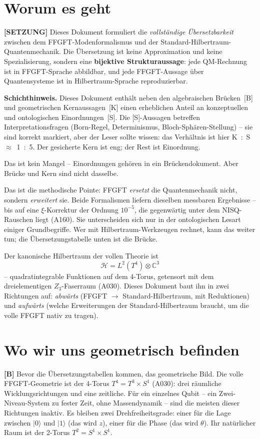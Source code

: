 \section{Worum es geht}

\textbf{[SETZUNG]} Dieses Dokument formuliert die \emph{vollständige
Übersetzbarkeit} zwischen dem FFGFT-Modenformalismus und der
Standard-Hilbert\-raum-Quantenmechanik. Die Übersetzung ist keine Approximation
und keine Spezialisierung, sondern eine \textbf{bijektive Strukturaussage}: jede
QM-Rechnung ist in FFGFT-Sprache abbildbar, und jede FFGFT-Aussage über
Quantensysteme ist in Hilbertraum-Sprache reproduzierbar.

\textbf{Schichthinweis.} Dieses Dokument enthält neben den algebraischen
Brücken~[B] und geometrischen Kernaussagen~[K] einen erheblichen Anteil an
konzeptuellen und ontologischen Einordnungen~[S]. Die [S]-Aussagen betreffen
Interpretationsfragen (Born-Regel, Determinismus, Bloch-Sphären-Stellung) --
sie sind korrekt markiert, aber der Leser sollte wissen: das Verhältnis ist
hier K~:~S~$\approx$~1~:~5. Der gesicherte Kern ist eng; der Rest ist Einordnung.

Das ist kein Mangel -- Einordnungen gehören in ein Brückendokument. Aber
Brücke und Kern sind nicht dasselbe.

Das ist die methodische Pointe: FFGFT \emph{ersetzt} die Quantenmechanik nicht,
sondern \emph{erweitert} sie. Beide Formalismen liefern dieselben messbaren Ergebnisse -- bis auf eine $\xi$-Korrektur der Ordnung $10^{-5}$, die
gegenwärtig unter dem NISQ-Rauschen liegt (A160). Sie unterscheiden sich nur in
der ontologischen Lesart einiger Grundbegriffe. Wer mit Hilbertraum-Werkzeugen
rechnet, kann das weiter tun; die Übersetzungstabelle unten ist die Brücke.

Der kanonische Hilbertraum der vollen Theorie ist
\[
  \boxed{\;\mathcal{H} = L^2(T^4)\otimes\mathbb{C}^3\;}
\]
-- quadratintegrable Funktionen auf dem 4-Torus, getensort mit dem
dreielementigen $Z_3$-Faserraum (A030). Dieses Dokument baut ihn in zwei
Richtungen auf: \emph{abwärts} (FFGFT $\to$ Standard-Hilbertraum, mit
Reduktionen) und \emph{aufwärts} (welche Erweiterungen der Standard-Hilbertraum
braucht, um die volle FFGFT nativ zu tragen).

\section{Wo wir uns geometrisch befinden}

\textbf{[B]} Bevor die Übersetzungstabellen kommen, das geometrische Bild. Die
volle FFGFT-Geometrie ist der 4-Torus $T^4 = T^3\times S^1$ (A030): drei
räumliche Wicklungsrichtungen und eine zeitliche. Für ein einzelnes Qubit -- ein
Zwei-Niveau-System zu fester Zeit, ohne Massendynamik -- sind die meisten dieser
Richtungen inaktiv. Es bleiben zwei Drehfreiheitsgrade: einer für die Lage
zwischen $|0\rangle$ und $|1\rangle$ (das wird $z$), einer für die Phase (das
wird $\theta$). Ihr natürlicher Raum ist der 2-Torus $T^2 = S^1\times S^1$.


